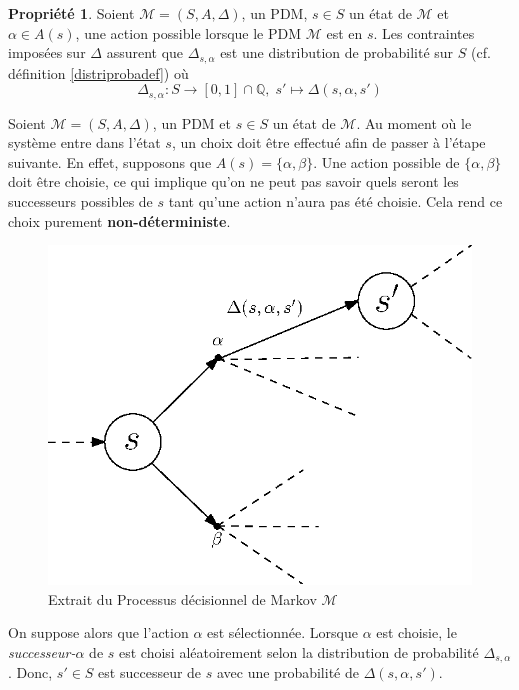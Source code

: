 \documentclass[12pt,a4paper]{report}
\theoremstyle{definition}%
\newtheorem{propriete}{Propriété}[chapter]
\theoremstyle{remark}
\newcommand{\cf}{cf. }
\begin{document}
\begin{propriete}
	Soient $\mathcal{M} = (S, A, \Delta)$, un PDM, $s \in S$ un état de $\mathcal{M}$ et $\alpha \in A(s)$, une action possible lorsque le PDM $\mathcal{M}$ est en $s$. Les contraintes imposées sur $\Delta$ assurent que $\Delta_{s, \alpha}$ est une distribution de probabilité sur $S$ (\cf définition \ref{distriprobadef}) où
	\[
		\Delta_{s, \alpha} : S \rightarrow [0, 1] \cap \mathbb{Q}, \; s' \mapsto \Delta(s, \alpha, s')
	\]
\end{propriete}

Soient $\mathcal{M} = (S, A, \Delta)$, un PDM et $s \in S$ un état de $\mathcal{M}$. Au moment où le système entre dans l'état $s$, un choix doit être effectué afin de passer à l'étape suivante. En effet, supposons que $A(s) = \{\alpha, \beta\}$. Une action possible de $\{\alpha, \beta \}$ doit être choisie, ce qui implique qu'on ne
peut pas savoir quels seront les successeurs possibles de $s$ tant qu'une action
n'aura pas été choisie. Cela rend ce choix purement \textbf{non-déterministe}.
\begin{figure}[H]
	\centering
	\includegraphics[scale=0.7]{figures/PDM-intuition.eps}
	\caption{Extrait du Processus décisionnel de Markov $\mathcal{M}$}
\end{figure}
On suppose alors que l'action $\alpha$ est sélectionnée. Lorsque $\alpha$ est choisie, le \textit{successeur-}$\alpha$ de $s$ est choisi aléatoirement selon la distribution de probabilité $\Delta_{s, \alpha}$. Donc, $s' \in S$ est successeur de $s$ avec une probabilité de $\Delta(s, \alpha, s')$.
\end{document}
